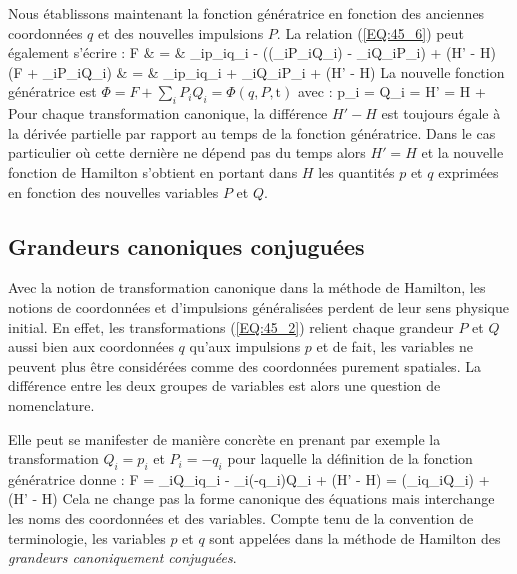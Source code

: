 Nous \'{e}tablissons maintenant la fonction g\'{e}n\'{e}ratrice en fonction des anciennes coordonn\'{e}es $q$ et des nouvelles impulsions $P$. La relation (\ref{EQ:45_6}) peut \'{e}galement s'\'{e}crire :
\bea
	F & = & \sum_{i}p_{i}q_{i} - \left((\sum_{i}P_{i}Q_{i}) - \sum_{i}Q_{i}P_{i}\right) + (H' - H) \nonumber \\
	\Leftrightarrow {}(F + \sum_{i}P_{i}Q_{i}) & = & \sum_{i}p_{i}q_{i} + \sum_{i}Q_{i}P_{i} + (H' - H) \nonumber
\eea
La nouvelle fonction g\'{e}n\'{e}ratrice est $\Phi = F + \sum_{i}P_{i}Q_{i} = \Phi(q,P,\mathrm{t})$ avec :
\be
	p_{i} = \text{, }Q_{i} = H' = H +  \label{EQ:45_8}
\ee
Pour chaque transformation canonique, la diff\'{e}rence $H' - H$ est toujours \'{e}gale \`{a} la d\'{e}riv\'{e}e partielle par rapport au temps de la fonction g\'{e}n\'{e}ratrice. Dans le cas particulier o\`{u} cette derni\`{e}re ne d\'{e}pend pas du temps alors $H' = H$ et la nouvelle fonction de Hamilton s'obtient en portant dans $H$ les quantit\'{e}s $p$ et $q$ exprim\'{e}es en fonction des nouvelles variables $P$ et $Q$.

\subsection{Grandeurs canoniques conjugu\'{e}es}\label{PAR:45_2}

Avec la notion de transformation canonique dans la m\'{e}thode de Hamilton, les notions de coordonn\'{e}es et d'impulsions g\'{e}n\'{e}ralis\'{e}es perdent de leur sens physique initial. En effet, les transformations (\ref{EQ:45_2}) relient chaque grandeur $P$ et $Q$ aussi bien aux coordonn\'{e}es $q$ qu'aux impulsions $p$ et de fait, les variables ne peuvent plus \^{e}tre consid\'{e}r\'{e}es comme des coordonn\'{e}es purement spatiales. La diff\'{e}rence entre les deux groupes de variables est alors une question de nomenclature.

Elle peut se manifester de mani\`{e}re concr\`{e}te en prenant par exemple la transformation $Q_{i} = p_{i}$ et $P_{i} = -q_{i}$ pour laquelle la d\'{e}finition de la fonction g\'{e}n\'{e}ratrice donne :
\benn
	F = \sum_{i}Q_{i}q_{i} - \sum_{i}(-q_{i})Q_{i} + (H' - H) = (\sum_{i}q_{i}Q_{i}) + (H' - H)
\eenn
Cela ne change pas la forme canonique des \'{e}quations mais interchange les noms des coordonn\'{e}es et des variables. Compte tenu de la convention de terminologie, les variables $p$ et $q$ sont appel\'{e}es dans la m\'{e}thode de Hamilton des \emph{grandeurs canoniquement conjugu\'{e}es}.

